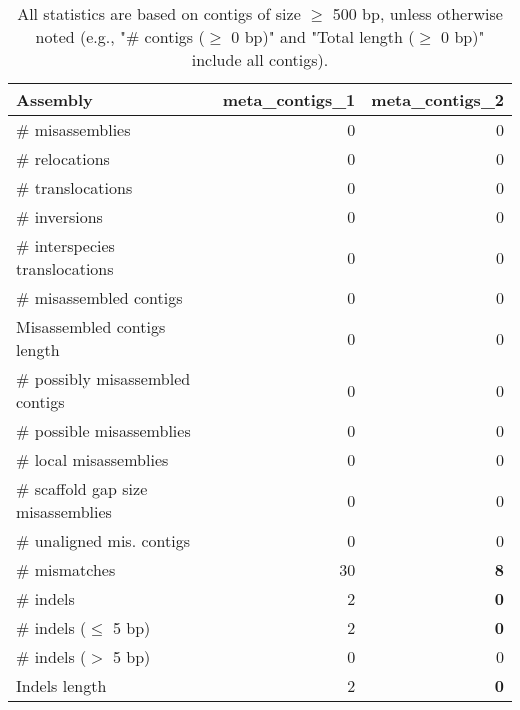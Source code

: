 \documentclass[12pt,a4paper]{article}
\begin{document}
\begin{table}[ht]
\begin{center}
\caption{All statistics are based on contigs of size $\geq$ 500 bp, unless otherwise noted (e.g., "\# contigs ($\geq$ 0 bp)" and "Total length ($\geq$ 0 bp)" include all contigs).}
\begin{tabular}{|l*{2}{|r}|}
\hline
Assembly & meta\_contigs\_1 & meta\_contigs\_2 \\ \hline
\# misassemblies & 0 & 0 \\ \hline
\hspace{5mm}\# relocations & 0 & 0 \\ \hline
\hspace{5mm}\# translocations & 0 & 0 \\ \hline
\hspace{5mm}\# inversions & 0 & 0 \\ \hline
\hspace{5mm}\# interspecies translocations & 0 & 0 \\ \hline
\# misassembled contigs & 0 & 0 \\ \hline
Misassembled contigs length & 0 & 0 \\ \hline
\# possibly misassembled contigs & 0 & 0 \\ \hline
\hspace{5mm}\# possible misassemblies & 0 & 0 \\ \hline
\# local misassemblies & 0 & 0 \\ \hline
\# scaffold gap size misassemblies & 0 & 0 \\ \hline
\# unaligned mis. contigs & 0 & 0 \\ \hline
\# mismatches & 30 & {\bf 8} \\ \hline
\# indels & 2 & {\bf 0} \\ \hline
\hspace{5mm}\# indels ($\leq$ 5 bp) & 2 & {\bf 0} \\ \hline
\hspace{5mm}\# indels ($>$ 5 bp) & 0 & 0 \\ \hline
Indels length & 2 & {\bf 0} \\ \hline
\end{tabular}
\end{center}
\end{table}
\end{document}
